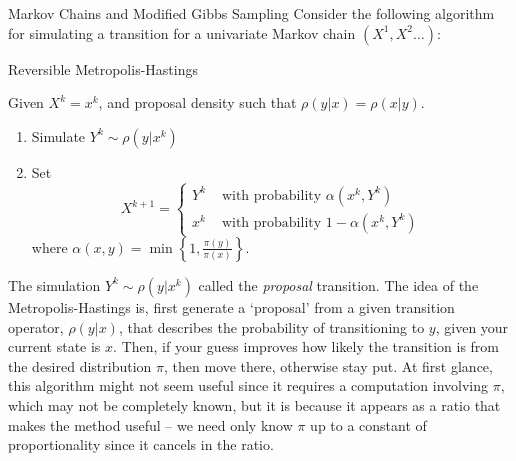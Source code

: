 \begin{chapter}{Markov Chains and Modified Gibbs Sampling}
Consider the following algorithm for simulating a transition for a univariate Markov chain $(X^1,X^2\dots)$:
\begin{algorithm}[H]
\caption{Reversible Metropolis-Hastings} \label{alg:metropolis}
Given $X^k = x^{k}$, and proposal density such that $\rho(y|x) = \rho(x|y)$.
\begin{enumerate}[1.]
  \item Simulate $Y^k \sim \rho(y|x^k)$
  \item Set
  \begin{equation*}
    X^{k+1} = \begin{cases}
      Y^k &\text{ with probability } \alpha(x^{k},Y^k) \\
      x^k &\text{ with probability } 1-\alpha(x^{k},Y^k)
    \end{cases} 
  \end{equation*}
  where $\displaystyle{\alpha(x,y) = \min\left\{1,\frac{\pi(y)}{\pi(x)}\right\}.}$ 
\end{enumerate}
\end{algorithm} 

The simulation $Y^k\sim \rho(y|x^k)$ called the \emph{proposal} transition.
The idea of the Metropolis-Hastings is, first generate a `proposal' from a given transition operator, $\rho(y|x)$, that describes the probability of transitioning to $y$, given your current state is $x$. 
Then, if your guess improves how likely the transition is from the desired distribution $\pi$, then move there, otherwise stay put.
At first glance, this algorithm might not seem useful since it requires a computation involving $\pi$, which may not be completely known, but it is because it appears as a ratio that makes the method useful -- we need only know $\pi$ up to a constant of proportionality since it cancels in the ratio.


\end{chapter}
